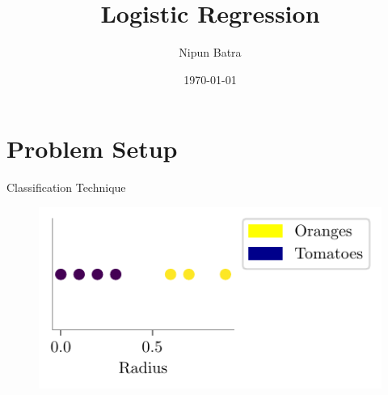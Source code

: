\documentclass{beamer}
\title{Logistic Regression}
\date{\today}
\author{Nipun Batra}
\institute{IIT Gandhinagar}
\begin{document}
	\maketitle

	\section{Problem Setup}
	
	\begin{frame}{Classification Technique}
	\begin{minipage}{0.3\textwidth}
		
		\begin{figure}
			
			\includegraphics{../figures/logistic-regression/logistic-orange-tomatoes-original.pdf}
		\end{figure}
	\end{minipage} \\

	
\end{frame}
	
\end{document}

